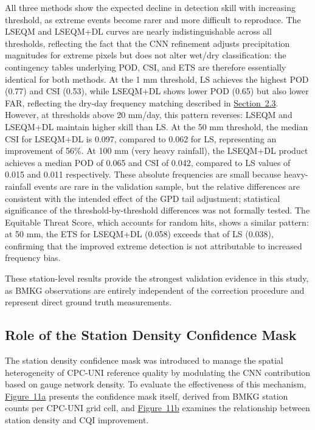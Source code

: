 \documentclass[11pt,a4paper]{article}
\begin{document}
All three methods show the expected decline in detection skill with
increasing threshold, as extreme events become rarer and more difficult
to reproduce. The LSEQM and LSEQM+DL curves are nearly indistinguishable
across all thresholds, reflecting the fact that the CNN refinement
adjusts precipitation magnitudes for extreme pixels but does not alter
wet/dry classification: the contingency tables underlying POD, CSI,
and ETS are therefore essentially identical for both methods. At the 1
mm threshold, LS achieves the highest POD (0.77) and CSI (0.53), while
LSEQM+DL shows lower POD (0.65) but also lower FAR, reflecting the
dry-day frequency matching \cite{ref11} described in \hyperref[hybrid-bias-correction-methodology]{Section~2.3}. However,
at thresholds above 20 mm/day, this pattern reverses: LSEQM and LSEQM+DL
maintain higher skill than LS. At the 50 mm threshold, the median CSI
for LSEQM+DL is 0.097, compared to 0.062 for LS, representing an
improvement of 56\%. At 100 mm (very heavy rainfall), the LSEQM+DL
product achieves a median POD of 0.065 and CSI of 0.042, compared to LS
values of 0.015 and 0.011 respectively. These absolute frequencies are
small because heavy-rainfall events are rare in the validation sample,
but the relative differences are consistent with the intended effect of
the GPD tail adjustment; statistical significance of the threshold-by-threshold
differences was not formally tested.
The Equitable Threat Score, which accounts for random hits, shows a
similar pattern: at 50 mm, the ETS for LSEQM+DL (0.058) exceeds that of
LS (0.038), confirming that the improved extreme detection is not
attributable to increased frequency bias.

These station-level results provide the strongest validation evidence in
this study, as BMKG observations are entirely independent of the
correction procedure and represent direct ground truth measurements.

\subsection{Role of the Station Density Confidence
Mask}\label{role-station-density}

The station density confidence mask was introduced to manage the spatial
heterogeneity of CPC-UNI reference quality by modulating the CNN
contribution based on gauge network density. To evaluate the
effectiveness of this mechanism, \hyperref[fig11]{Figure~11a} presents the confidence mask
itself, derived from BMKG station counts per CPC-UNI grid cell, and
\hyperref[fig11]{Figure~11b} examines the relationship between station density and CQI
improvement.
\end{document}

